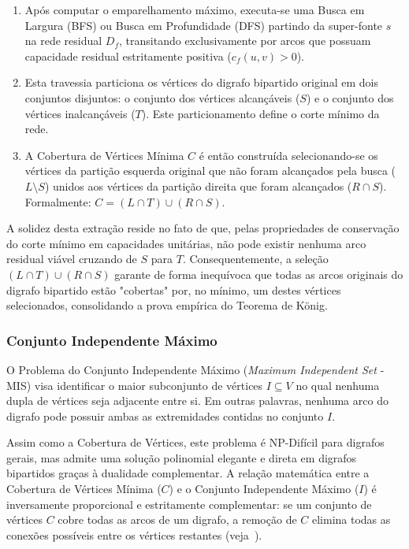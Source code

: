 \documentclass[12pt,a4paper]{article}
\begin{document}
\begin{enumerate}
    \item Após computar o emparelhamento máximo, executa-se uma Busca em Largura (BFS) ou Busca em Profundidade (DFS) partindo da super-fonte $s$ na rede residual $D_f$, transitando exclusivamente por arcos que possuam capacidade residual estritamente positiva ($c_f(u,v) > 0$).
    \item Esta travessia particiona os vértices do digrafo bipartido original em dois conjuntos disjuntos: o conjunto dos vértices alcançáveis ($S$) e o conjunto dos vértices inalcançáveis ($T$). Este particionamento define o corte mínimo da rede.
    \item A Cobertura de Vértices Mínima $C$ é então construída selecionando-se os vértices da partição esquerda original que não foram alcançados pela busca ($L \setminus S$) unidos aos vértices da partição direita que foram alcançados ($R \cap S$). Formalmente: $C = (L \cap T) \cup (R \cap S)$.
\end{enumerate}

A solidez desta extração reside no fato de que, pelas propriedades de conservação do corte mínimo em capacidades unitárias, não pode existir nenhuma arco residual viável cruzando de $S$ para $T$. Consequentemente, a seleção $(L \cap T) \cup (R \cap S)$ garante de forma inequívoca que todas as arcos originais do digrafo bipartido estão "cobertas" por, no mínimo, um destes vértices selecionados, consolidando a prova empírica do Teorema de König.

\subsubsection{Conjunto Independente Máximo}

O Problema do Conjunto Independente Máximo (\textit{Maximum Independent Set} - MIS) visa identificar o maior subconjunto de vértices $I \subseteq V$ no qual nenhuma dupla de vértices seja adjacente entre si. Em outras palavras, nenhuma arco do digrafo pode possuir ambas as extremidades contidas no conjunto $I$.

Assim como a Cobertura de Vértices, este problema é NP-Difícil para digrafos gerais, mas admite uma solução polinomial elegante e direta em digrafos bipartidos graças à dualidade complementar. A relação matemática entre a Cobertura de Vértices Mínima ($C$) e o Conjunto Independente Máximo ($I$) é inversamente proporcional e estritamente complementar: se um conjunto de vértices $C$ cobre todas as arcos de um digrafo, a remoção de $C$ elimina todas as conexões possíveis entre os vértices restantes (veja~\cite{cook1998combinatorial}).
\end{document}
